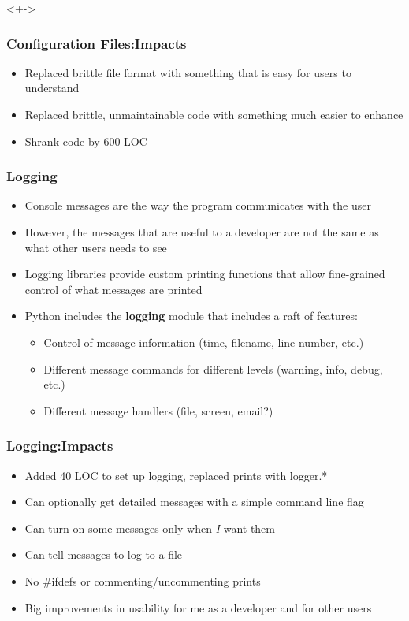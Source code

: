 \documentclass[red, hyperref={pdfpagelabels=false}]{beamer}
\begin{document}
\begin{frame}{<+->}
  \frametitle{Configuration Files:Impacts}
  \begin{itemize}
     {  }
     {  }
    \item<3-> Replaced brittle file format with something that is easy for users to understand
    \item<4-> Replaced brittle, unmaintainable code with something much easier to enhance
    \item<5-> Shrank code by 600 LOC
  \end{itemize}
\end{frame}

\begin{frame}
  \frametitle{Logging}
  \begin{itemize}
    \item Console messages are the way the program communicates with the user
    \item However, the messages that are useful to a developer are not the
      same as what other users needs to see
    \item Logging libraries provide custom printing functions that allow fine-grained
      control of what messages are printed
    \item Python includes the {\bf logging} module that includes a raft of features:
    \begin{itemize}
      \item Control of message information (time, filename, line number, etc.)
      \item Different message commands for different levels (warning, info, debug, etc.)
      \item Different message handlers (file, screen, email?)
    \end{itemize}
  \end{itemize}
\end{frame}

\begin{frame}[<+->]
  \frametitle{Logging:Impacts}
  \begin{itemize}
    \item Added 40 LOC to set up logging, replaced prints with logger.*
    \item Can optionally get detailed messages with a simple command line flag
    \item Can turn on some messages only when \emph{I} want them
    \item Can tell messages to log to a file
    \item No \#ifdefs or commenting/uncommenting prints
    \item Big improvements in usability for me as a developer and for other users
  \end{itemize}
\end{frame}
\end{document}
